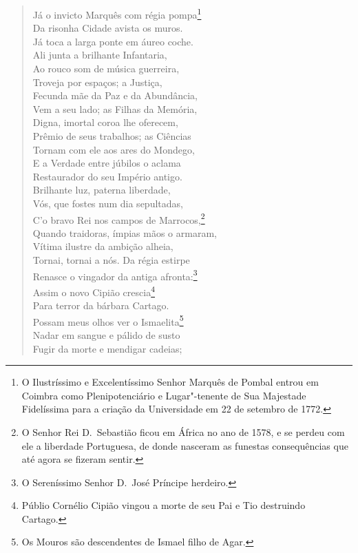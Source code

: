 \begin{verse}
Já o invicto Marquês com régia pompa\footnote{ O Ilustríssimo e
Excelentíssimo Senhor Marquês de Pombal entrou em Coimbra como Plenipotenciário		
e Lugar"-tenente de Sua Majestade Fidelíssima para a criação da Universidade em
22 de setembro de 1772.}\\		\index{\Marqpombal}
Da risonha Cidade avista os muros.\\
Já toca a larga ponte em áureo coche.\\
Ali junta a brilhante Infantaria,\\
Ao rouco som de música guerreira,\\
Troveja por espaços; a Justiça,\\
Fecunda mãe da Paz e da Abundância,\\
Vem a seu lado; as Filhas da Memória,\\			\index{\Filmemo}
Digna, imortal coroa lhe oferecem,\\
Prêmio de seus trabalhos; as Ciências\\ 
Tornam com ele aos ares do Mondego,\\		\index{\Monde}
E a Verdade entre júbilos o aclama\\
Restaurador do seu Império antigo.\\	
Brilhante luz, paterna liberdade,\\
Vós, que fostes num dia sepultadas,\\
C'o bravo Rei nos campos de Marrocos,\footnote{ O Senhor Rei D.~Sebastião
ficou em África no ano de 1578, e se perdeu com ele a liberdade
Portuguesa, de donde nasceram as funestas consequências que até agora se fizeram
sentir.}\\
Quando traidoras, ímpias mãos o armaram,\\
Vítima ilustre da ambição alheia,\\
Tornai, tornai a nós. Da régia estirpe\\
Renasce o vingador da antiga afronta:\footnote{ O Sereníssimo Senhor D.~José
Príncipe herdeiro.}\\
Assim o novo Cipião crescia\footnote{ Públio Cornélio Cipião vingou a
morte de seu Pai e Tio destruindo Cartago.}\\		\index{\Cipiao}
Para terror da bárbara Cartago.\\
Possam meus olhos ver o Ismaelita\footnote{Os Mouros são descendentes
de Ismael filho de Agar.}\\	\index{\Ismae}
Nadar em sangue e pálido de susto\\
Fugir da morte e mendigar cadeias;\\

\end{verse}
